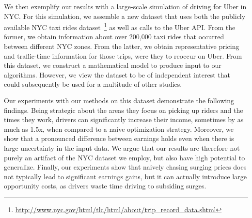 We then exemplify our  results with a large-scale simulation of driving for Uber in NYC. 
For this simulation, we assemble a new dataset that uses both the publicly available NYC taxi rides 
dataset~\footnote{\url{http://www.nyc.gov/html/tlc/html/about/trip_record_data.shtml}} as well as calls to the Uber API.
From the former, we obtain information about over 200,000 taxi rides that occurred between different NYC zones. 
From the latter, we obtain representative pricing and traffic-time information for those trips, were they to reoccur on Uber.
From this dataset, we construct a mathematical model to produce input to our algorithms. 
However, we view the dataset to be of independent interest that could subsequently be used for a multitude of other studies.

Our experiments with our methods on this dataset demonstrate the following findings.
Being strategic about the areas they focus on picking up riders and the times they work, 
drivers can significantly increase their income, sometimes by
as much as 1.5x, when compared to a naive optimization strategy.
Moreover, we show that a pronounced difference between earnings holds even when there is large uncertainty in the input data. 
We argue that our results are therefore not purely an artifact of the NYC dataset we employ, 
  but also have high potential to generalize.
Finally, our experiments show that naively chasing surging prices does not typically lead 
  to significant earnings gains, but it can actually introduce large opportunity costs, as drivers
  waste time driving to subsiding surges. 
